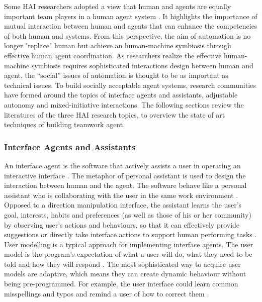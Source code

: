 Some \ac{HAI} researchers adopted a view that human and agents are equally important team players in a human agent system \cite{Sukthankara}. It highlights the importance of mutual interaction between human and agents that can enhance the competencies of both human and systems. From this perspective, the aim of automation is no longer "replace" human but achieve an human-machine symbiosis through effective human agent coordination. As researchers realize the effective human-machine symbiosis requires sophisticated interactions design between human and agent, the ``social'' issues of automation is thought to be as important as technical issues\cite{Bradshaw2011}. To build socially acceptable agent systems, research communities have formed around the topics of interface agents and assistants, adjustable autonomy and mixed-initiative interactions. The following sections review the literatures of the three \ac{HAI} research topics, to overview the state of art techniques of building teamwork agent. 

\subsubsection{Interface Agents and Assistants}\label{sec:lrinterfaceagent}
An interface agent is the software that actively assists a user in operating an interactive interface \cite{Lieberman2003}. The metaphor of personal assistant is used to design the interaction between human and the agent. The software behave like a personal assistant who is collaborating with the user in the same work environment \cite{Lieberman1997}. Opposed to a direction manipulation interface, the assistant learns the user's goal, interests, habits and preferences (as well as those of his or her community) by observing user's actions and behaviours,  so that it can effectively provide suggestions or directly take interface actions to support human performing tasks \cite{Maes1994}.\\

User modelling is a typical approach for implementing interface agents. The user model is the program's expectation of what a user will do, what they need to be told and how they will respond \cite{Lieberman2003}.  The most sophisticated way to acquire user models are adaptive, which means they can create dynamic behaviour without being pre-programmed. For example, the user interface could learn common misspellings and typos and remind a user of how to correct them \cite{Lieberman2003}.\\

